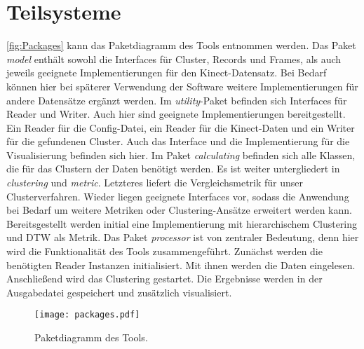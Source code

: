\section{Teilsysteme}
\label{4-Teilsysteme}
\autoref{fig:Packages} kann das Paketdiagramm des Tools entnommen werden.
Das Paket \emph{model} enthält sowohl die Interfaces für Cluster, Records und Frames,
als auch jeweils geeignete Implementierungen für den Kinect-Datensatz.
Bei Bedarf können hier bei späterer Verwendung der Software weitere Implementierungen
für andere Datensätze ergänzt werden.
Im \emph{utility}-Paket befinden sich Interfaces für Reader und Writer.
Auch hier sind geeignete Implementierungen bereitgestellt.
Ein Reader für die Config-Datei, ein Reader für die Kinect-Daten
und ein Writer für die gefundenen Cluster.
Auch das Interface und die Implementierung für die Visualisierung befinden sich hier.
Im Paket \emph{calculating} befinden sich alle Klassen, die für das Clustern der Daten benötigt werden.
Es ist weiter untergliedert in \emph{clustering} und \emph{metric}.
Letzteres liefert die Vergleichsmetrik für unser Clusterverfahren.
Wieder liegen geeignete Interfaces vor,
sodass die Anwendung bei Bedarf um weitere Metriken oder Clustering-Ansätze erweitert werden kann.
Bereitsgestellt werden initial eine Implementierung mit hierarchischem Clustering
und \ac{DTW} als Metrik.
Das Paket \emph{processor} ist von zentraler Bedeutung,
denn hier wird die Funktionalität des Tools zusammengeführt.
Zunächst werden die benötigten Reader Instanzen initialisiert.
Mit ihnen werden die Daten eingelesen.
Anschließend wird das Clustering gestartet.
Die Ergebnisse werden in der Ausgabedatei gespeichert und zusätzlich visualisiert.
\begin{figure}[ht]
    \begin{center}
    \texttt{[image: packages.pdf]}
    \end{center}
    \caption{Paketdiagramm des Tools.}
    \label{fig:Packages}
\end{figure}

\clearpage
